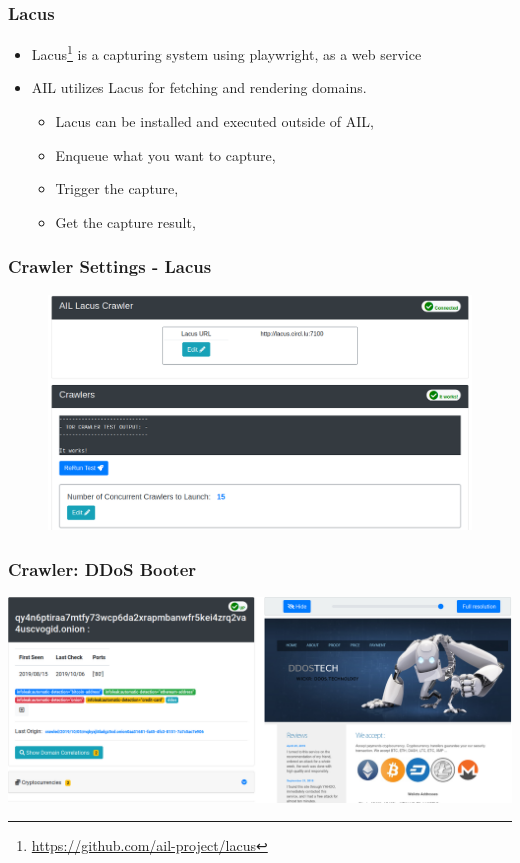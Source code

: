 \documentclass{beamer}
\begin{document}
\begin{frame}
    \frametitle{Lacus}
    	\begin{itemize}
            \item Lacus\footnote{\url{https://github.com/ail-project/lacus}} is a capturing system using playwright, as a web service
		    \item AIL utilizes Lacus for fetching and rendering domains.
			\begin{itemize}
				\item Lacus can be installed and executed outside of AIL,
				\item Enqueue what you want to capture,
				\item Trigger the capture,
				\item Get the capture result,
			\end{itemize}
        \end{itemize}
\end{frame}

\begin{frame}
	\frametitle{Crawler Settings - Lacus}
		\begin{figure}
		    \includegraphics[scale=0.28]{screenshot/crawler_settings.png}
		\end{figure}
\end{frame}

\begin{frame}
    \frametitle{Crawler: DDoS Booter}
    \centerline{
        \includegraphics[scale=0.23]{images/crawled-ddos.png}
    }
\end{frame}
\end{document}
